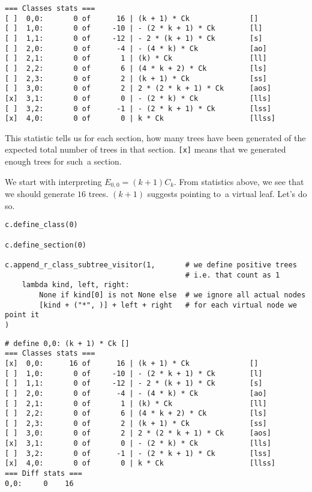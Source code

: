 \documentclass[final]{article}
\theoremstyle{definition}
\theoremstyle{definition}
\theoremstyle{remark}
\begin{document}
\begin{lstlisting}
=== Classes stats ===
[ ]  0,0:       0 of      16 | (k + 1) * Ck              []
[ ]  1,0:       0 of     -10 | - (2 * k + 1) * Ck        [l]
[ ]  1,1:       0 of     -12 | - 2 * (k + 1) * Ck        [s]
[ ]  2,0:       0 of      -4 | - (4 * k) * Ck            [ao]
[ ]  2,1:       0 of       1 | (k) * Ck                  [ll]
[ ]  2,2:       0 of       6 | (4 * k + 2) * Ck          [ls]
[ ]  2,3:       0 of       2 | (k + 1) * Ck              [ss]
[ ]  3,0:       0 of       2 | 2 * (2 * k + 1) * Ck      [aos]
[x]  3,1:       0 of       0 | - (2 * k) * Ck            [lls]
[ ]  3,2:       0 of      -1 | - (2 * k + 1) * Ck        [lss]
[x]  4,0:       0 of       0 | k * Ck                    [llss]
\end{lstlisting}

This statistic tells us for each section, how many trees have been generated of the expected total number of trees in that section. \verb|[x]| means that we generated enough trees for such~a section.

We start with interpreting \(E_{0,0} = (k + 1) C_k\). From statistics above, we see that we should generate \(16\) trees. \((k + 1)\) suggests pointing to~a virtual leaf. Let's do so.

\begin{lstlisting}
c.define_class(0)

c.define_section(0)

c.append_r_class_subtree_visitor(1,       # we define positive trees
                                          # i.e. that count as 1
    lambda kind, left, right:
        None if kind[0] is not None else  # we ignore all actual nodes
        [kind + ("*", )] + left + right   # for each virtual node we point it
)
\end{lstlisting}

\begin{lstlisting}
# define 0,0: (k + 1) * Ck []
=== Classes stats ===
[x]  0,0:      16 of      16 | (k + 1) * Ck              []
[ ]  1,0:       0 of     -10 | - (2 * k + 1) * Ck        [l]
[ ]  1,1:       0 of     -12 | - 2 * (k + 1) * Ck        [s]
[ ]  2,0:       0 of      -4 | - (4 * k) * Ck            [ao]
[ ]  2,1:       0 of       1 | (k) * Ck                  [ll]
[ ]  2,2:       0 of       6 | (4 * k + 2) * Ck          [ls]
[ ]  2,3:       0 of       2 | (k + 1) * Ck              [ss]
[ ]  3,0:       0 of       2 | 2 * (2 * k + 1) * Ck      [aos]
[x]  3,1:       0 of       0 | - (2 * k) * Ck            [lls]
[ ]  3,2:       0 of      -1 | - (2 * k + 1) * Ck        [lss]
[x]  4,0:       0 of       0 | k * Ck                    [llss]
=== Diff stats ===
0,0:     0    16
\end{lstlisting}
\end{document}
